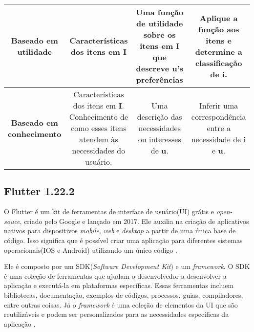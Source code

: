 \begin{table}[]
\begin{tabular}{|c|c|c|c|}
	\textbf{Baseado em utilidade} & \begin{minipage} [t] {0.2\textwidth} \centering Características dos itens em \textbf{I} \end{minipage}  & \begin{minipage} [t] {0.2\textwidth} 
		Uma função de utilidade sobre os itens em \textbf{I} que descreve \textbf{u}'s preferências \end{minipage}   & \begin{minipage} [t] {0.2\textwidth} Aplique a função aos itens e determine a classificação de \textbf{i}.  \end{minipage}  \\ \hline
	\textbf{Baseado em conhecimento}  & \begin{minipage} [t] {0.2\textwidth} \centering Características dos itens em \textbf{I}. Conhecimento de como esses itens atendem às necessidades do usuário.  \end{minipage}  & \begin{minipage} [t] {0.2\textwidth} Uma descrição das necessidades ou interesses de \textbf{u}.\end{minipage}  &  \begin{minipage} [t] {0.2\textwidth}  
		Inferir uma correspondência entre a necessidade de \textbf{i} e \textbf{u}. \end{minipage} \\ \hline
	\end{tabular}
\end{table}

\subsection{Flutter 1.22.2}

O Flutter \cite{flutter2017} é um kit de ferramentas de interface de usuário(UI) 
grátis e \emph{open-souce}, criado pelo Google e lançado em 2017. 
Ele auxilia na criação de aplicativos nativos para dispositivos 
\emph{mobile}, \emph{web} e \emph{desktop} a partir de uma 
única base de código. Isso significa que é possível criar uma 
aplicação para diferentes sistemas operacionais(IOS e Android) 
utilizando um único código \cite{flutter2017}.

Ele é composto por um SDK(\emph{Software Development Kit}) e um
\emph{framework}. O SDK é uma coleção de ferramentas que ajudam
o desenvolvedor a desenvolver a aplicação e executá-la em
plataformas específicas. Essas ferramentas incluem bibliotecas,
documentação, exemplos de códigos, processos, guias,
compiladores, entre outras coisas. Já o \emph{framework} é
uma coleção de elementos da UI que são reutilizáveis e podem
ser personalizados para as necessidades específicas da
aplicação \cite{flutter2017}.

